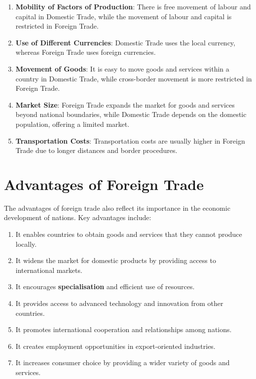 \documentclass[12pt,a4paper, openany]{book}
\begin{document}
\begin{enumerate}
	\item \textbf{Mobility of Factors of Production}:
	      There is free movement of labour and capital in Domestic Trade, while the movement of labour and capital is restricted in Foreign Trade.
	\item \textbf{Use of Different Currencies}:
	      Domestic Trade uses the local currency, whereas Foreign Trade uses foreign currencies.
	\item \textbf{Movement of Goods}:
	      It is easy to move goods and services within a country in Domestic Trade, while cross-border movement is more restricted in Foreign Trade.
	\item \textbf{Market Size}:
	      Foreign Trade expands the market for goods and services beyond national boundaries, while Domestic Trade depends on the domestic population, offering a limited market.
	\item \textbf{Transportation Costs}:
	      Transportation costs are usually higher in Foreign Trade due to longer distances and border procedures.
\end{enumerate}

\section{Advantages of Foreign Trade}
The advantages of foreign trade also reflect its importance in the economic development of nations. Key advantages include:

\begin{enumerate}
	\item It enables countries to obtain goods and services that they cannot produce locally.
	\item It widens the market for domestic products by providing access to international markets.
	\item It encourages \textbf{specialisation} and efficient use of resources.
	\item It provides access to advanced technology and innovation from other countries.
	\item It promotes international cooperation and relationships among nations.
	\item It creates employment opportunities in export-oriented industries.
	\item It increases consumer choice by providing a wider variety of goods and services.
\end{enumerate}
\end{document}
